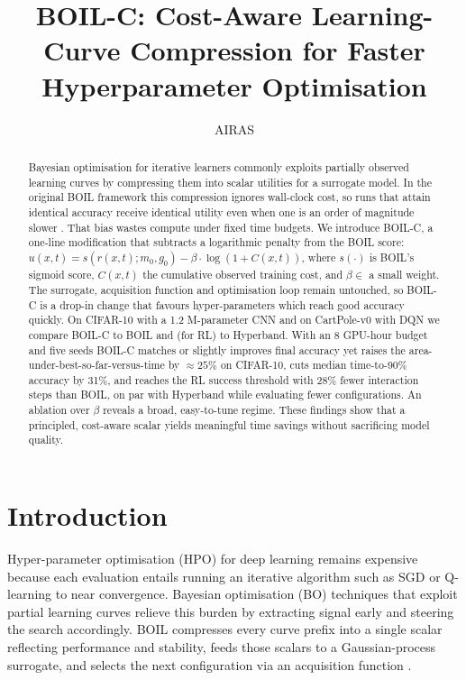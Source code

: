 \documentclass{article} %
\title{BOIL-C: Cost-Aware Learning-Curve Compression for Faster Hyperparameter Optimisation}
\author{AIRAS}
\begin{document}
\maketitle

\begin{abstract}
Bayesian optimisation for iterative learners commonly exploits partially observed learning curves by compressing them into scalar utilities for a surrogate model. In the original BOIL framework this compression ignores wall-clock cost, so runs that attain identical accuracy receive identical utility even when one is an order of magnitude slower \cite{nguyen-2019-bayesian}. That bias wastes compute under fixed time budgets. We introduce BOIL-C, a one-line modification that subtracts a logarithmic penalty from the BOIL score: \(u(x,t)=s(r(x,t);m_0,g_0)-\beta\cdot\log(1+C(x,t))\), where \(s(\cdot)\) is BOIL's sigmoid score, \(C(x,t)\) the cumulative observed training cost, and \(\beta\in\) a small weight. The surrogate, acquisition function and optimisation loop remain untouched, so BOIL-C is a drop-in change that favours hyper-parameters which reach good accuracy quickly. On CIFAR-10 with a 1.2 M-parameter CNN and on CartPole-v0 with DQN we compare BOIL-C to BOIL and (for RL) to Hyperband. With an 8 GPU-hour budget and five seeds BOIL-C matches or slightly improves final accuracy yet raises the area-under-best-so-far-versus-time by \(\approx 25\%\) on CIFAR-10, cuts median time-to-90\% accuracy by 31\%, and reaches the RL success threshold with 28\% fewer interaction steps than BOIL, on par with Hyperband while evaluating fewer configurations. An ablation over \(\beta\) reveals a broad, easy-to-tune regime. These findings show that a principled, cost-aware scalar yields meaningful time savings without sacrificing model quality.
\end{abstract}

\section{Introduction}
\label{sec:intro}
Hyper-parameter optimisation (HPO) for deep learning remains expensive because each evaluation entails running an iterative algorithm such as SGD or Q-learning to near convergence. Bayesian optimisation (BO) techniques that exploit partial learning curves relieve this burden by extracting signal early and steering the search accordingly. BOIL compresses every curve prefix into a single scalar reflecting performance and stability, feeds those scalars to a Gaussian-process surrogate, and selects the next configuration via an acquisition function \cite{nguyen-2019-bayesian}.
\end{document}
